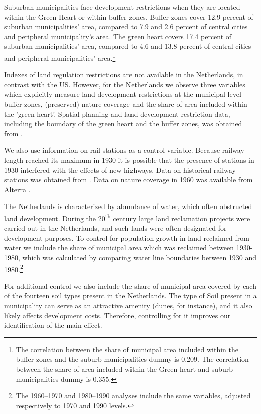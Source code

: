 \documentclass[a4paper,authoryear,review]{elsarticle}  	%
\begin{document}
	Suburban municipalities face development restrictions when they are located within the Green Heart or within buffer zones. Buffer zones cover 12.9 percent of suburban municipalities’ area, compared to 7.9 and 2.6 percent of central cities and peripheral municipality’s area. The green heart covers 17.4 percent of suburban municipalities’ area, compared to 4.6 and 13.8 percent of central cities and peripheral municipalities’ area.\footnote{The correlation between the share of municipal area included within the buffer zones and the suburb municipalities dummy is 0.209. The correlation between the share of area included within the Green heart and suburb municipalities dummy is 0.355.}

	Indexes of land regulation restrictions are not available in the Netherlands, in contrast with the US. However, for the Netherlands we observe three variables which explicitly measure land development restrictions at the municipal level - buffer zones, (preserved) nature coverage and the share of area included within the 'green heart'. Spatial planning and land development restriction data, including the boundary of the green heart and the buffer zones, was obtained from \citet{Koomen2008}. 
	
	We also use information on rail stations as a control variable. Because railway length reached its maximum in 1930 it is possible that the presence of stations in 1930 interfered with the effects of new highways. Data on historical railway stations was obtained from \citet{Koopmans2012}. Data on nature coverage in 1960 was available from Alterra \citep{Kramer2005}. 	

	The Netherlands is characterized by abundance of water, which often obstructed land development. During the 20\textsuperscript{th} century large land reclamation projects were carried out in the Netherlands, and such lands were often designated for development purposes. To control for population growth in land reclaimed from water we include the share of municipal area which was reclaimed between 1930-1980, which was calculated by comparing water line boundaries between 1930 and 1980.\footnote{The 1960--1970 and 1980--1990 analyses include the same variables, adjusted respectively to 1970 and 1990 levels.} 
	
	For additional control we also include the share of municipal area covered by each of the fourteen soil types present in the Netherlands. The type of Soil present in a municipality can serve as an attractive amenity (dunes, for instance), and it also likely affects development costs. Therefore, controlling for it improves our identification of the main effect.
	
\end{document}
